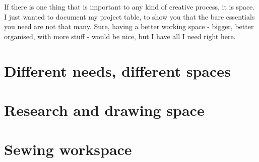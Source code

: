 If there is one thing that is important to any kind of creative process, it is space. I just wanted to document my project table, to show you that the bare essentials you need are not that many. Sure, having a better working space - bigger, better organised, with more stuff - would be nice, but I have all I need right here.

\section{Different needs, different spaces}


\section{Research and drawing space}


\section{Sewing workspace}

